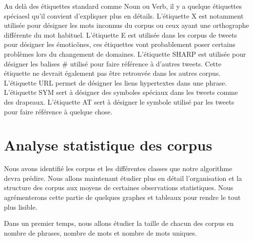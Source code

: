 \documentclass[french, 14pt]{memoir}
\begin{document}
 Au delà des étiquettes standard comme Noun ou Verb, il y a quelque étiquettes spéciaesl qu'il convient d'expliquer plus en détails. L'étiquette X est notamment utilisée pour désigner les mots inconnus du corpus ou ceux ayant une orthographe différente du mot habituel. L'étiquette E est utilisée dans les corpus de tweets pour désigner les émoticônes, ces étiquettes vont probablement poser certains problèmes lors du changement de domaines. L'étiquette SHARP est utilisée pour désigner les balises \# utilisé pour faire référence à d'autres tweets. Cette étiquette ne devrait également pas être retrouvée dans les autres corpus. L'étiquette URL permet de désigner les liens hypertextes dans une phrase. L'étiquette SYM sert à désigner des symboles spéciaux dans les tweets comme des drapeaux. L'étiquette AT sert à désigner le symbole \@ utilisé par les tweets pour faire référence à quelque chose.
 
\section{Analyse statistique des corpus}

Nous avons identifié les corpus et les différentes classes que notre algorithme devra prédire. Nous allons maintenant étudier plus en détail l'organisation et la structure des corpus aux moyens de certaines observations statistiques. Nous agrémenterons cette partie de quelques graphes et tableaux pour rendre le tout plus lisible.

Dans un premier temps, nous allons étudier la taille de chacun des corpus en nombre de phrases, nombre de mots et nombre de mots uniques.
\end{document}
